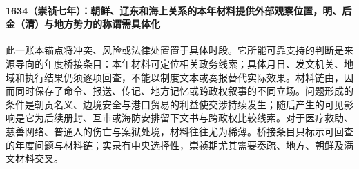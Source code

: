 \paragraph{1634（崇祯七年）：朝鲜、辽东和海上关系的本年材料提供外部观察位置，明、后金（清）与地方势力的称谓需具体化} 此一账本锚点将冲突、风险或法律处置置于具体时段。它所能可靠支持的判断是来源导向的年度桥接条目：本年材料可定位相关政务线索；具体月日、发文机关、地域和执行结果仍须逐项回查，不能以制度文本或奏报替代实际效果。材料链由，因而同时保存了命令、报送、传记、地方记忆或跨政权叙事的不同立场。问题形成的条件是朝贡名义、边境安全与港口贸易的利益使交涉持续发生；随后产生的可见影响是它为后续册封、互市或海防安排留下文书与跨政权比较线索。对于医疗救助、慈善网络、普通人的伤亡与案狱处境，材料往往尤为稀薄。桥接条目只标示可回查的年度问题与材料链；实录有中央选择性，崇祯期尤其需要奏疏、地方、朝鲜及满文材料交叉。
